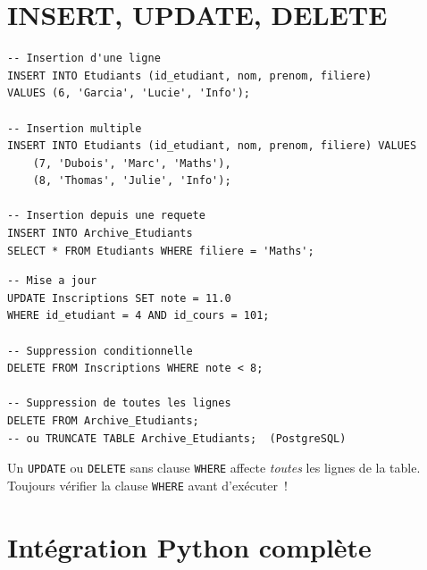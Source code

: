 \section{INSERT, UPDATE, DELETE}

\begin{codeblock}[title=\textbf{Insertion de donn\'ees}]
\begin{verbatim}
-- Insertion d'une ligne
INSERT INTO Etudiants (id_etudiant, nom, prenom, filiere)
VALUES (6, 'Garcia', 'Lucie', 'Info');

-- Insertion multiple
INSERT INTO Etudiants (id_etudiant, nom, prenom, filiere) VALUES
    (7, 'Dubois', 'Marc', 'Maths'),
    (8, 'Thomas', 'Julie', 'Info');

-- Insertion depuis une requete
INSERT INTO Archive_Etudiants
SELECT * FROM Etudiants WHERE filiere = 'Maths';
\end{verbatim}
\end{codeblock}

\begin{codeblock}[title=\textbf{Mise \`a jour et suppression}]
\begin{verbatim}
-- Mise a jour
UPDATE Inscriptions SET note = 11.0
WHERE id_etudiant = 4 AND id_cours = 101;

-- Suppression conditionnelle
DELETE FROM Inscriptions WHERE note < 8;

-- Suppression de toutes les lignes
DELETE FROM Archive_Etudiants;
-- ou TRUNCATE TABLE Archive_Etudiants;  (PostgreSQL)
\end{verbatim}
\end{codeblock}

\begin{attention}[title=\textbf{UPDATE/DELETE sans WHERE}]
Un \texttt{UPDATE} ou \texttt{DELETE} sans clause \texttt{WHERE} affecte
\emph{toutes} les lignes de la table. Toujours v\'erifier la clause
\texttt{WHERE} avant d'ex\'ecuter~!
\end{attention}

\section{Int\'egration Python compl\`ete}

